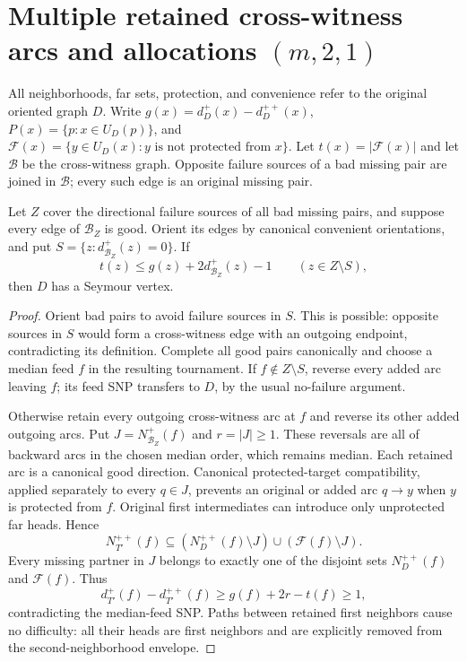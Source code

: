 \section{Multiple retained cross-witness arcs and allocations $(m,2,1)$}
\label{sec:three-two-one-exclusion}

All neighborhoods, far sets, protection, and convenience refer to the
original oriented graph $D$.  Write $g(x)=d_D^+(x)-d_D^{++}(x)$,
$P(x)=\{p:x\in U_D(p)\}$, and
$\mathcal F(x)=\{y\in U_D(x):y\text{ is not protected from }x\}$.
Let $t(x)=|\mathcal F(x)|$ and let $\mathcal B$ be the cross-witness
graph.  Opposite failure sources of a bad missing pair are joined in
$\mathcal B$; every such edge is an original missing pair.

\begin{lemma}
\label{lem:multiple-retained-source-criterion}
Let $Z$ cover the directional failure sources of all bad missing pairs,
and suppose every edge of $\mathcal B_Z$ is good.  Orient its edges by
canonical convenient orientations, and put
$S=\{z:d_{\mathcal B_Z}^+(z)=0\}$.  If
\[
 t(z)\le g(z)+2d_{\mathcal B_Z}^+(z)-1
 \qquad(z\in Z\setminus S),
\]
then $D$ has a Seymour vertex.
\end{lemma}
\begin{proof}
Orient bad pairs to avoid failure sources in $S$.  This is possible:
opposite sources in $S$ would form a cross-witness edge with an
outgoing endpoint, contradicting its definition.  Complete all good
pairs canonically and choose a median feed $f$ in the resulting
tournament.  If $f\notin Z\setminus S$, reverse every added arc
leaving $f$; its feed SNP transfers to $D$, by the usual no-failure
argument.

Otherwise retain every outgoing cross-witness arc at $f$ and reverse
its other added outgoing arcs.  Put $J=N_{\mathcal B_Z}^+(f)$ and
$r=|J|\ge1$.  These reversals are all of backward arcs in the chosen
median order, which remains median.  Each retained arc is a canonical
good direction.  Canonical protected-target compatibility, applied
separately to every $q\in J$, prevents an original or added arc
$q\to y$ when $y$ is protected from $f$.  Original first intermediates
can introduce only unprotected far heads.  Hence
\[
 N_{T'}^{++}(f)\subseteq
 (N_D^{++}(f)\setminus J)\cup
 (\mathcal F(f)\setminus J).
\]
Every missing partner in $J$ belongs to exactly one of the disjoint
sets $N_D^{++}(f)$ and $\mathcal F(f)$.  Thus
\[
 d_{T'}^+(f)-d_{T'}^{++}(f)\ge g(f)+2r-t(f)\ge1,
\]
contradicting the median-feed SNP.  Paths between retained first
neighbors cause no difficulty: all their heads are first neighbors
and are explicitly removed from the second-neighborhood envelope.
\end{proof}

